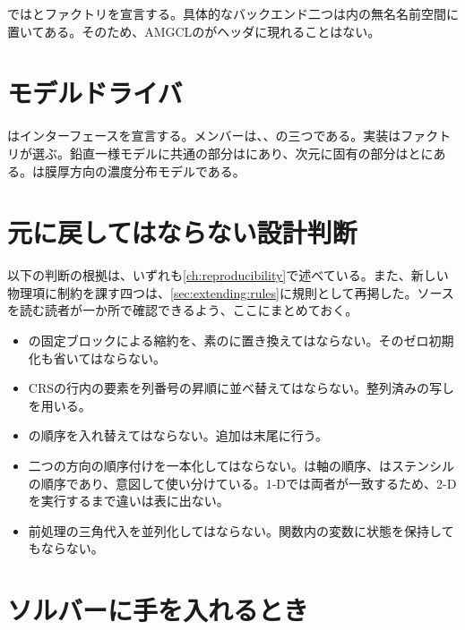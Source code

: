 ではとファクトリを宣言する。具体的なバックエンド二つは内の無名名前空間に置いてある。そのため、AMGCLのがヘッダに現れることはない。

\section{モデルドライバ}
\label{sec:layout:models}

はインターフェースを宣言する。メンバーは、、の三つである。実装はファクトリが選ぶ。鉛直一様モデルに共通の部分はにあり、次元に固有の部分はとにある。は膜厚方向の濃度分布モデルである。

\section{元に戻してはならない設計判断}
\label{sec:layout:donottouch}

以下の判断の根拠は、いずれも\cref{ch:reproducibility}で述べている。また、新しい物理項に制約を課す四つは、\cref{sec:extending:rules}に規則として再掲した。ソースを読む読者が一か所で確認できるよう、ここにまとめておく。

\begin{warn}
\begin{itemize}
  \item {}の固定ブロックによる縮約を、素のに置き換えてはならない。そのゼロ初期化も省いてはならない。
  \item CRSの行内の要素を列番号の昇順に並べ替えてはならない。整列済みの写しを用いる。
  \item {}の順序を入れ替えてはならない。追加は末尾に行う。
  \item 二つの方向の順序付けを一本化してはならない。は軸の順序、はステンシルの順序であり、意図して使い分けている。1-Dでは両者が一致するため、2-Dを実行するまで違いは表に出ない。
  \item 前処理の三角代入を並列化してはならない。関数内の変数に状態を保持してもならない。
\end{itemize}
\end{warn}

\section{ソルバーに手を入れるとき}
\label{sec:layout:workflow}

